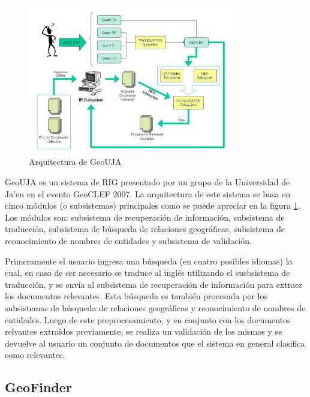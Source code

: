 \begin{figure}[htb]%
	\begin{center}
		\includegraphics[width=0.8\textwidth]{geouja_arch.jpg}
	\end{center}
	\caption{Arquitectura de GeoUJA \cite{perea2007}}
	\label{fig:archgeouja}
\end{figure}

GeoUJA \cite{perea2007} es un sistema de RIG presentado por un grupo de la
Universidad de Ja'en en el evento GeoCLEF 2007. La arquitectura de este sistema
se basa en cinco módulos (o subsistemas) principales como se puede apreciar en
la figura \ref{fig:archgeouja}. Los módulos son: subsistema de recuperación de
información, subsistema de traducción, subsistema de búsqueda de relaciones
geográficas, subsistema de reonocimiento de nombres de entidades y subsistema
de validación.

Primeramente el usuario ingresa una búsqueda (en cuatro posibles idiomas) la
cual, en caso de ser necesario se traduce al inglés utilizando el susbsistema
de traducción, y se envía al subsistema de recuperación de información para
extraer los documentos relevantes. Esta búsqueda es también procesada por los
subsistemas de búsqueda de relaciones geográficas y reonocimiento de nombres de
entidades. Luego de este preprocesamiento, y en conjunto con los documentos
relvantes extraídos previamente, se realiza un validación de los mismos y se
devuelve al usuario un conjunto de documentos que el sistema en general
clasifica como relevantes.

\clearpage

\subsection{GeoFinder}\label{sec:archgeofinder}

